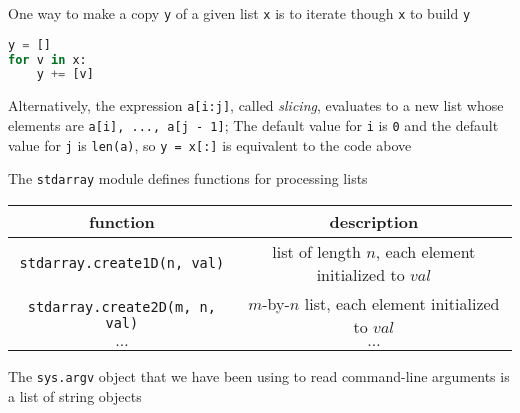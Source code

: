 \documentclass[8pt,a4paper,compress]{beamer}
\begin{document}
\begin{frame}[fragile]
One way to make a copy \lstinline{y} of a given list \lstinline{x} is to iterate though \lstinline{x} to build \lstinline{y}
\begin{lstlisting}[language=Python]
y = []
for v in x:
    y += [v]
\end{lstlisting}

\bigskip

Alternatively, the expression \lstinline{a[i:j]}, called \emph{slicing},  evaluates to a new list whose elements are \lstinline{a[i], ..., a[j - 1]}; The default value for \lstinline{i} is \lstinline{0} and the default value for \lstinline{j} is \lstinline{len(a)}, so \lstinline{y = x[:]} is equivalent to the code above

\bigskip

The \lstinline{stdarray} module defines functions for processing lists

\begin{center}
\begin{tabular}{cc}
function & description \\ \hline
\lstinline$stdarray.create1D(n, val)$ & list of length $n$, each element initialized to $val$ \\
\lstinline$stdarray.create2D(m, n, val)$ & $m$-by-$n$ list, each element initialized to $val$ \\
$\dots$ & $\dots$
\end{tabular} 
\end{center}

\bigskip

The \lstinline{sys.argv} object that we have been using to read command-line arguments is a list of string objects
\end{frame}
\end{document}
